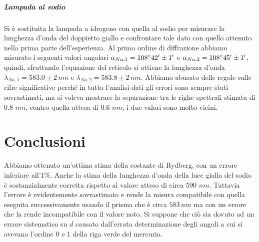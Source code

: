 \documentclass[10pt,a4paper]{article}
\begin{document}
\subparagraph{Lampada al sodio}
Si è sostituita la lampada a idrogeno con quella al sodio per misurare la lunghezza d'onda del doppietto giallo e confrontare tale dato con quello attenuto nella prima parte dell'esperienza. Al primo ordine di diffrazione abbiamo misurato i seguenti valori angolari $\alpha_{Na,1}= 108\degree 42'\pm 1' $ e $\alpha_{Na,2}=108\degree 45' \pm 1'$, quindi, sfruttando l'equazione del reticolo si ottiene la lunghezza d'onda $\lambda_{Na,1}=583.0 \pm 2 \,nm$ e $\lambda_{Na,2}=583.8 \pm 2 \,nm$.
Abbiamo abusato delle regole sulle cifre significative perché in tutta l'analisi dati gli errori sono sempre stati sovrastimati, ma si voleva mostrare la separazione tra le righe spettrali stimata di $0.8 \, \,nm$, contro quella attesa di $0.6 \, \,nm$, i due valori sono molto vicini.\\

\section{Conclusioni}
Abbiamo ottenuto un'ottima stima della costante di Rydberg, con un errore inferiore all'$1\%$. Anche la stima della lunghezza d'onda della luce gialla del sodio è sostanzialmente corretta rispetto al valore atteso di circa $590 \, \,nm$. Tuttavia l'errore è evidentemente sovrastimato e rende la misura  compatibile con quella eseguita successivamente usando il prisma che è circa $583\,nm$ ma con un errore che la rende incompatibile con il valore noto. Si suppone che ciò sia dovuto ad un errore sistematico su $d$ causato dall'errata determinazione degli angoli a cui si avevano l'ordine 0 e 1 della riga verde del mercurio.\\
\end{document}
